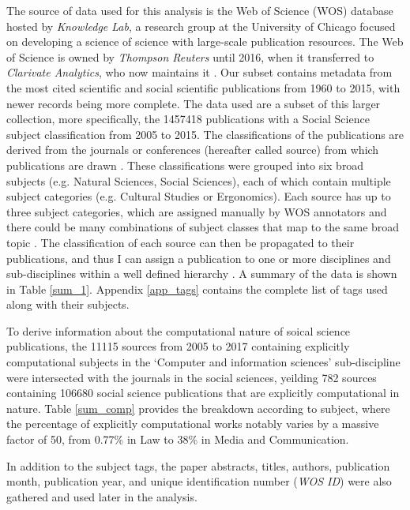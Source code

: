 \documentclass[12pt, a4paper]{article}
\begin{document}
The source of data used for this analysis is the Web of Science (WOS) database hosted by  \textit{Knowledge Lab}, a research group at the University of Chicago focused on developing  a  science  of  science \citep{chu2018too} with  large-scale publication resources. The Web of Science is owned by \textit{Thompson Reuters} until 2016, when it transferred to \textit{Clarivate Analytics}, who now maintains it \citep{clarivate}. Our  subset contains metadata from the most cited scientific and  social scientific publications from 1960 to 2015, with newer records being more complete. The data used are a subset of this larger collection, more specifically, the \num{1457418} publications with a Social Science subject classification from 2005 to 2015. The classifications of the publications are derived from the journals or conferences (hereafter called source) from which publications are drawn \citep{kottawos}. These  classifications  were grouped into six broad subjects (e.g. Natural Sciences, Social Sciences), each of which contain multiple subject categories (e.g. Cultural Studies or Ergonomics). Each source has up to three subject categories, which are assigned manually by WOS annotators and there could be many combinations  of 	subject classes that map to the same broad topic \citep{efremenkova2016comparison}. The classification  of  each  source  can  then  be  propagated to their publications, and thus I can assign a publication to one or more disciplines and sub-disciplines within a well defined hierarchy \citep{wossubjects}. A summary of the data is shown in Table \ref{sum_1}. Appendix \ref{app_tags} contains the complete list of tags used along with their subjects.

To derive information about the computational nature of soical science
publications, the \num{11115} sources from 2005 to 2017 containing explicitly computational subjects in the `Computer and information sciences' sub-discipline were intersected with the journals in the social sciences, yeilding \num{782} sources containing \num{106680} social science publications that are explicitly computational in nature. Table \ref{sum_comp} provides the breakdown according to subject, where the percentage of explicitly computational works notably varies by a massive factor of \num{50}, from \num{0.77}\% in Law to \num{38}\% in Media and Communication. 

In addition to the subject tags, the paper abstracts, titles, authors, publication month, publication year, and unique identification number (\textit{WOS ID}) were also gathered and used later in the analysis.
\end{document}
